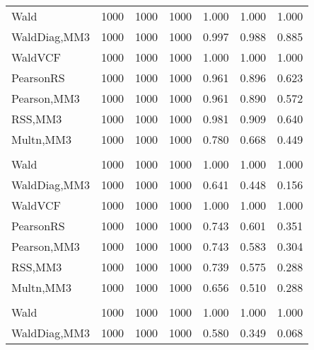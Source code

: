 \documentclass[
]{article}
\begin{document}
\begin{table}[H]
{\begin{tabular}[t]{lrrrrrr}
\hspace{1em}Wald & 1000 & 1000 & 1000 & 1.000 & 1.000 & \vphantom{2} 1.000\\
\hspace{1em}WaldDiag,MM3 & 1000 & 1000 & 1000 & 0.997 & 0.988 & 0.885\\
\hspace{1em}WaldVCF & 1000 & 1000 & 1000 & 1.000 & 1.000 & \vphantom{1} 1.000\\
\hspace{1em}PearsonRS & 1000 & 1000 & 1000 & 0.961 & 0.896 & 0.623\\
\hspace{1em}Pearson,MM3 & 1000 & 1000 & 1000 & 0.961 & 0.890 & 0.572\\
\hspace{1em}RSS,MM3 & 1000 & 1000 & 1000 & 0.981 & 0.909 & 0.640\\
\hspace{1em}Multn,MM3 & 1000 & 1000 & 1000 & 0.780 & 0.668 & 0.449\\
\addlinespace[0.3em]
\multicolumn{7}{l}{\textbf{2F 10V}}\\
\hspace{1em}Wald & 1000 & 1000 & 1000 & 1.000 & 1.000 & \vphantom{1} 1.000\\
\hspace{1em}WaldDiag,MM3 & 1000 & 1000 & 1000 & 0.641 & 0.448 & 0.156\\
\hspace{1em}WaldVCF & 1000 & 1000 & 1000 & 1.000 & 1.000 & 1.000\\
\hspace{1em}PearsonRS & 1000 & 1000 & 1000 & 0.743 & 0.601 & 0.351\\
\hspace{1em}Pearson,MM3 & 1000 & 1000 & 1000 & 0.743 & 0.583 & 0.304\\
\hspace{1em}RSS,MM3 & 1000 & 1000 & 1000 & 0.739 & 0.575 & 0.288\\
\hspace{1em}Multn,MM3 & 1000 & 1000 & 1000 & 0.656 & 0.510 & 0.288\\
\addlinespace[0.3em]
\multicolumn{7}{l}{\textbf{3F 15V}}\\
\hspace{1em}Wald & 1000 & 1000 & 1000 & 1.000 & 1.000 & 1.000\\
\hspace{1em}WaldDiag,MM3 & 1000 & 1000 & 1000 & 0.580 & 0.349 & 0.068\\

\end{tabular}}
\end{table}
\end{document}
